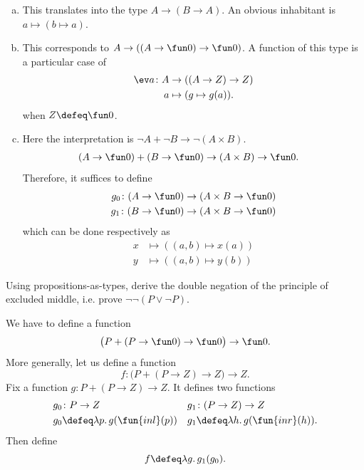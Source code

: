 \begin{solution}
    \begin{enumerate}[a)]
        \item This translates into the type $A\to(B\to A)$. An obvious inhabitant is $a\mapsto(b\mapsto a)$.

        \item This corresponds to $A\to((A\to\fun0)\to\fun0)$. A function of this type is a particular case of
        \begin{align*}
            \ev a\colon A&\to((A\to Z)\to Z)\\
            a&\mapsto(g\mapsto g(a)).
        \end{align*}
        when $Z\defeq\fun0$.

        \item Here the interpretation is $\neg A+\neg B\to\neg (A\times B)$.
        \begin{align*}
            (A\to\fun0)+(B\to\fun0)&\to(A\times B)\to\fun0.
        \end{align*}
        Therefore, it suffices to define
        \begin{align*}
            g_0\colon(A\to\fun0)&\to(A\times B\to\fun0)\\
            g_1\colon(B\to\fun0)&\to(A\times B\to\fun0)
        \end{align*}
        which can be done respectively as
        \begin{align*}
            x&\mapsto((a,b)\mapsto x(a))\\
            y&\mapsto((a,b)\mapsto y(b))
        \end{align*}
    \end{enumerate}
\end{solution}

\begin{exr}
    Using propositions-as-types, derive the double negation of the principle of excluded middle, i.e.\/ prove\/ $\neg\neg(P\lor\neg P)$.    
\end{exr}

\begin{solution}
    We have to define a function
    \[
        \bigl(P+(P\to\fun0)\to\fun0\bigr)\to\fun0.
    \]
    More generally, let us define a function
    \[
        f\colon\bigl(P+(P\to Z)\to Z\bigr)\to Z.
    \]
    Fix a function $g\colon P+(P\to Z)\to Z$. It defines two functions
    \begin{align*}
        g_0 &\colon P \to Z & g_1 &\colon (P \to Z) \to Z \\
        g_0 &\defeq \lambda p.\, g(\fun{inl}(p)) & g_1 &\defeq \lambda h.\, g(\fun{inr}(h)).
    \end{align*}
    Then define
    \[
        f \defeq \lambda g.\, g_1(g_0).
    \]
\end{solution}


